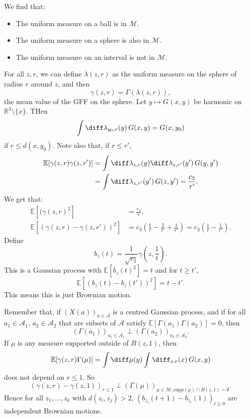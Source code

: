 \documentclass[12pt]{article}
\begin{document}
We find that:
\begin{itemize}
	\item The uniform measure on a ball is in $\mathcal{M}$.
	\item The uniform measure on a sphere is also in $\mathcal{M}$.
	\item The uniform measure on an interval is not in $\mathcal{M}$.
\end{itemize}

For all $z, r$, we can define $\lambda(z, r)$ as the uniform measure on the sphere of radius $r$ around $z$, and then
\[
\gamma(z, r) = \Gamma(\lambda(z, r)),
\]
the mean value of the GFF on the sphere. Let $y \mapsto G(x, y)$ be harmonic on $\mathbb{R}^3 \setminus \{x\}$. THen
\[
\int \diff \lambda_{y_0, r} (y) \, G(x, y) = G(x, y_0)
\]
if $r \leq d(x, y_0)$. Note also that, if $r \leq r'$,
\begin{align*}
	\mathbb{E}[\gamma(z, r) \gamma(z, r')] &= \int \diff \lambda_{z, r}(y) \diff \lambda_{z, r'}(y') \, G(y, y') \\
					       &= \int \diff \lambda_{z, r'} (y') \, G(z, y') = \frac{c_3}{r'}.
\end{align*}
We get that:
\begin{align*}
	\mathbb{E}[(\gamma(z, r)^2] &= \frac{c_3}{r}, \\
	\mathbb{E}[(\gamma(z, r) - \gamma(z, r'))^2] &= c_3 \left( \frac 1r - \frac{2}{r'} + \frac 1{r'} \right) = c_3 \left( \frac 1r - \frac 1{r'}\right).
\end{align*}
Define
\[
	b_z(t) = \frac{1}{\sqrt{c_3}} \gamma \left(z, \frac 1t \right).
\]
This is a Gaussian process with $\mathbb{E}[b_z(t)^2] = t$ and for $t \geq t'$,
\[
\mathbb{E}[(b_z(t) - b_z(t'))^2] = t - t'.
\]
This means this is just Brownian motion.

Remember that, if $(X(a))_{a \in \mathcal{A}}$ is a centred Gaussian process, and if for all $a_1 \in \mathcal{A}_1$, $a_2 \in \mathcal{A}_2$ that are subsets of $\mathcal{A}$ satisfy $\mathbb{E}[\Gamma(a_1) \Gamma(a_2)] = 0$, then
\[
	(\Gamma(a_1))_{a_1 \in \mathcal{A}_1} \perp (\Gamma(a_2))_{a_2 \in \mathcal{A}_2}.
\]
If $\mu$ is any measure supported outside of $B(z, 1)$, then
\[
\mathbb{E}[\gamma(z, r) \Gamma(\mu)] = \int \diff \mu(y) \int \diff_{z, r}(x) \, G(x, y)
\]
does not depend on $r \leq 1$. So
\[
	(\gamma(z, r) - \gamma(z, 1))_{r \leq 1} \perp (\Gamma(\mu))_{\mu \in \mathcal{M}, \mathrm{supp}(\mu) \cap B(z, 1) = \emptyset}.
\]
Hence for all $z_1, \ldots, z_k$ with $d(z_i, z_j) > 2$, $(b_{z_i}(t+1) - b_{z_i}(1))_{t \geq 0}$ are independent Brownian motions.
\end{document}
